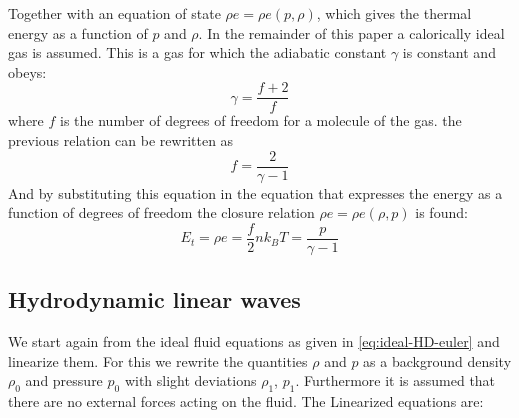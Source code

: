 Together with an equation of state $\rho e = \rho e(p, \rho)$, which gives the thermal energy as a function of $p$ and $\rho$.
In the remainder of this paper a calorically ideal gas is assumed. This is a gas for which the adiabatic constant $\gamma$ is constant and obeys:
\begin{equation}
	\gamma = \frac{f+2}{f}
	\label{eq:adiabatic constant}
\end{equation}
where $f$ is the number of degrees of freedom for a molecule of the gas. the previous relation can be rewritten as
\begin{equation*}
	f = \frac{2}{\gamma-1}
\end{equation*}
And by substituting this equation in the equation that expresses the energy as a function of degrees of freedom the closure relation $\rho e= \rho e(\rho, p)$ is found:
\begin{equation*}
	E_t = \rho e = \frac{f}{2}nk_BT = \frac{p}{\gamma-1}
\end{equation*}
\subsection{Hydrodynamic linear waves}
We start again from the ideal fluid equations as given in \cref{eq:ideal-HD-euler} and linearize them.
For this we rewrite the quantities $\rho$ and $p$ as a background density $\rho_0$ and pressure $p_0$ with slight deviations $\rho_1$, $p_1$.
Furthermore it is assumed that there are no external forces acting on the fluid. The Linearized equations are:

